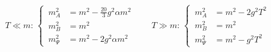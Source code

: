 \begin{equation}
\label{eq:massen}
T\ll m:\, \left\{\,
\begin{array}{rl}
  m_A^2&=m^2-\tfrac{20}{3}g^2\alpha m^2\\[1mm]
  m_B^2&=m^2\\[1mm]
  m_\Psi^2&=m^2-2 g^2\alpha m^2
\end{array}\right.
\qquad
T\gg m:\, \left\{\,
\begin{array}{rl}
  m_A^2&=m^2-2g^2 T^2\\[1mm]
  m_B^2&=m^2\\[1mm]
  m_\Psi^2&=m^2-g^2 T^2
\end{array}\right.
\end{equation}


